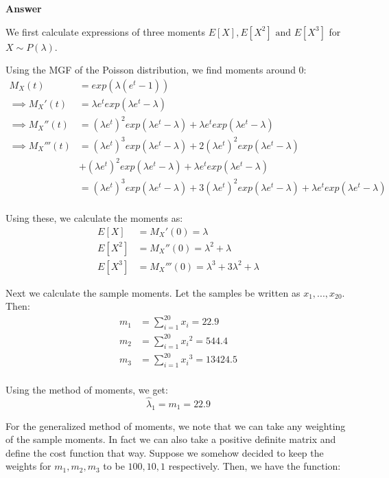 \documentclass[12pt, oneside]{article}
\begin{document}
\begin{enumerate}
{  \textbf{Answer}

  We first calculate expressions of three moments \(E[X], E[X^2] \text{ and } E[X^3]\) for
  \(X \sim P(\lambda)\).

  Using the MGF of the Poisson distribution, we find moments around 0:
  \begin{align*}
    M_X(t) &= exp(\lambda(e^t - 1)) \\
    \implies M_X'(t) &= \lambda e^t exp(\lambda e^t - \lambda) \\
    \implies M_X''(t) &= (\lambda e^t)^2 exp(\lambda e^t - \lambda) + \lambda e^t exp(\lambda e^t - \lambda) \\
    \implies M_X'''(t) &= (\lambda e^t)^3 exp(\lambda e^t - \lambda) + 2 (\lambda e^t)^2 exp(\lambda e^t - \lambda) \\
        &+ (\lambda e^t)^2 exp(\lambda e^t - \lambda) + \lambda e^t exp(\lambda e^t - \lambda) \\
        &= (\lambda e^t)^3 exp(\lambda e^t - \lambda) + 3 (\lambda e^t)^2 exp(\lambda e^t - \lambda) + \lambda e^t exp(\lambda e^t - \lambda) \\
  \end{align*}

  Using these, we calculate the moments as:
  \begin{align*}
    E[X] &= M_X'(0) = \lambda \\
    E[X^2] &= M_X''(0) = \lambda^2 + \lambda \\
    E[X^3] &= M_X'''(0) = \lambda^3 + 3\lambda^2 + \lambda
  \end{align*}

  Next we calculate the sample moments. Let the samples be written as \(x_1, ..., x_{20}\). Then:
  \begin{align*}
    m_1 &= \sum_{i=1}^{20} x_i  = 22.9\\
    m_2 &= \sum_{i=1}^{20} {x_i}^2 = 544.4 \\
    m_3 &= \sum_{i=1}^{20} {x_i}^3 = 13424.5 \\
  \end{align*}

  Using the method of moments, we get:
  \[\widehat{\lambda}_1 = m_1 = 22.9\]

  For the generalized method of moments, we note that we can take any weighting of the
  sample moments. In fact we can also take a positive definite matrix and define the
  cost function that way. Suppose we somehow decided to keep the weights for \(m_1, m_2, m_3\)
  to be \(100, 10, 1\) respectively. Then, we have the function:

}
\end{enumerate}
\end{document}
